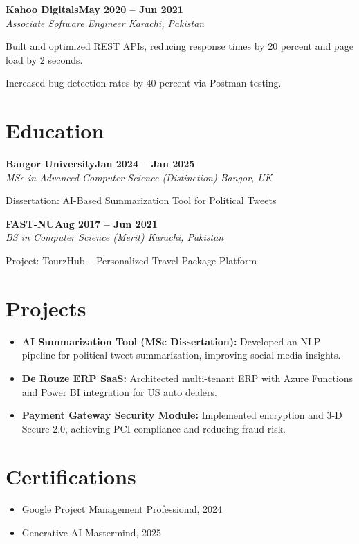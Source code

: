 \documentclass[letterpaper,10pt]{article}
\newcommand{\headingBf}[2]{
  \hspace{10pt}\textbf{#1}\hfill\textbf{#2}\\
}
\newcommand{\headingIt}[2]{
  \hspace{10pt}\textit{#1}\hfill\textit{#2}\\
}
\newenvironment{resume_list}{
  \vspace{-7pt}
  \begin{itemize}[itemsep=-2px, parsep=1pt, leftmargin=30pt]
}{
  \end{itemize}
}
\begin{document}
\headingBf{Kahoo Digitals}{May 2020 -- Jun 2021}
\headingIt{Associate Software Engineer \hfill Karachi, Pakistan}{}
\begin{resume_list}
    \item Built and optimized REST APIs, reducing response times by 20 percent and page load by 2 seconds.
    \item Increased bug detection rates by 40 percent via Postman testing.
\end{resume_list}

\section{Education}

\headingBf{Bangor University}{Jan 2024 -- Jan 2025}
\headingIt{MSc in Advanced Computer Science (Distinction) \hfill Bangor, UK}{}
\begin{resume_list}
    \item Dissertation: AI-Based Summarization Tool for Political Tweets
\end{resume_list}

\headingBf{FAST-NU}{Aug 2017 -- Jun 2021}
\headingIt{BS in Computer Science (Merit) \hfill Karachi, Pakistan}{}
\begin{resume_list}
    \item Project: TourzHub -- Personalized Travel Package Platform
\end{resume_list}

\section{Projects}
\begin{itemize}
    \setlength\itemsep{3pt}
    \item \textbf{AI Summarization Tool (MSc Dissertation):} Developed an NLP pipeline for political tweet summarization, improving social media insights.
    \item \textbf{De Rouze ERP SaaS:} Architected multi-tenant ERP with Azure Functions and Power BI integration for US auto dealers.
    \item \textbf{Payment Gateway Security Module:} Implemented encryption and 3-D Secure 2.0, achieving PCI compliance and reducing fraud risk.
\end{itemize}

\section{Certifications}
\begin{itemize}
    \item Google Project Management Professional, 2024
    \item Generative AI Mastermind, 2025
\end{itemize}

\vspace*{\fill}
\end{document}
